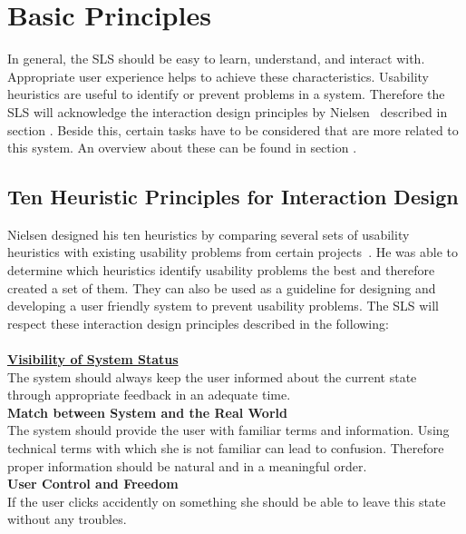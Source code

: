 \section{Basic Principles}\label{4_1_general}
In general, the SLS should be easy to learn, understand, and interact with. Appropriate user experience helps to achieve these characteristics. Usability heuristics are useful to identify or prevent problems in a system. Therefore the SLS will acknowledge the interaction design principles by Nielsen~\cite{Nielsen_1994-he} described in section \textit{}. Beside this, certain tasks have to be considered that are more related to this system. An overview about these can be found in section \textit{}.

\subsection{Ten Heuristic Principles for Interaction Design}\label{nielsenDesignPrinciples}
Nielsen designed his ten heuristics by comparing several sets of usability heuristics with existing usability problems from certain projects~\cite{Nielsen_1994-he}. He was able to determine which heuristics identify usability problems the best and therefore created a set of them. They can also be used as a guideline for designing and developing a user friendly system to prevent usability problems. The SLS will respect these interaction design principles described in the following:
\\\\
\textbf{\hyperref[4_1_1_visibilitySystemStatus]{Visibility of System Status}}\\
The system should always keep the user informed about the current state through appropriate feedback in an adequate time.\\

\textbf{Match between System and the Real World}\\
The system should provide the user with familiar terms and information. Using technical terms with which she is not familiar can lead to confusion. Therefore proper information should be natural and in a meaningful order.\\

\textbf{User Control and Freedom}\\
If the user clicks accidently on something she should be able to leave this state without any troubles.\\

